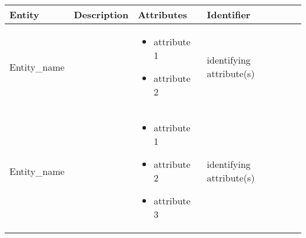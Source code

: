 \begin{longtable}{|p{}|p{} |p{}|p{} |} 
\hline
\textbf{Entity} & \textbf{Description} & \textbf{Attributes} & \textbf{Identifier}  \\\hline


Entity\_name & & \begin{itemize}
        \vspace{-1em}
        \item attribute 1
        \item attribute 2
    \end{itemize}
 &  identifying attribute(s)\\\hline
 
 Entity\_name & & \begin{itemize}
        \vspace{-1em}
        \item attribute 1
        \item attribute 2
        \item attribute 3
    \end{itemize}
 &  identifying attribute(s) \\\hline

\end{longtable}